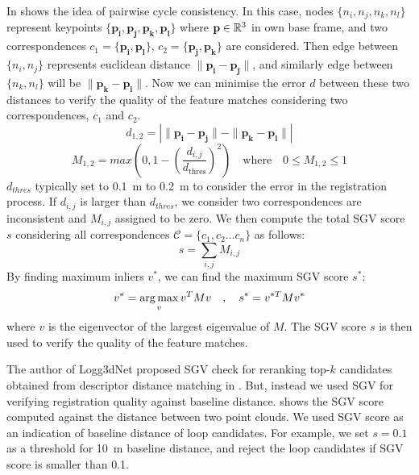 In  shows the idea of pairwise cycle consistency. In this case, nodes $\{n_i, n_j, n_k, n_l\}$ represent keypoints $\{\mathbf{p_i}, \mathbf{p_j}, \mathbf{p_k}, \mathbf{p_l}\}$ where $\mathbf{p} \in \mathbb{R}^{3}$ in own base frame, and two correspondences $c_1 =\{\mathbf{p_i}, \mathbf{p_l}\}$, $c_2=\{\mathbf{p_j}, \mathbf{p_k}\}$ are considered. Then edge between $\{n_i, n_j\}$  represents euclidean distance $\| \mathbf{p_i}-\mathbf{p_j} \|$, and similarly edge between $\{n_k, n_l\}$ will be $\| \mathbf{p_k}-\mathbf{p_l} \|$. Now we can minimise the error $d$ between these two distances to verify the quality of the feature matches considering two correspondences, $c_1$ and $c_2$. 
\begin{equation}
  d_{1,2} = |\| \mathbf{p_i}-\mathbf{p_j} \| - \| \mathbf{p_k}-\mathbf{p_l} \| | 
\end{equation}
\begin{equation}
  M_{1,2} = max( 0 , 1 - \left(\frac{d_{i,j}}{d_{\text{thres}}}\right)^2 ) 
  \quad \text{where} \quad 0 \leq M_{1,2} \leq 1 
\end{equation}
$d_{thres}$ typically set to \SI{0.1}{\meter} to \SI{0.2}{\meter} to consider the error in the registration process. If $d_{i,j}$ is larger than $d_{thres}$, we consider two correspondences are inconsistent and $M_{i,j}$ assigned to be zero.  
We then compute the total SGV score $s$ considering all correspondences $\mathcal{C}=\{c_1, c_2 \ldots c_n\}$ as follows:
\begin{equation}
  s = \sum_{i,j} M_{i,j} 
\end{equation}
By finding maximum inliers $v^{*}$, we can find the maximum SGV score $s^{*}$: 
\begin{equation}
  v^{*} = \operatorname*{arg\,max}_{v} v^T M v \quad, \quad
  s^{*} = v^{*T} M v^{*}
\end{equation}
where $v$ is the eigenvector of the largest eigenvalue of $M$. The SGV score $s$ is then used to verify the quality of the feature matches.

The author of Logg3dNet proposed SGV check for reranking top-$k$ candidates obtained from descriptor distance matching in . But, instead we used SGV for verifying registration quality against baseline distance.  shows the SGV score computed against the distance between two point clouds. We used SGV score as an indication of baseline distance of loop candidates. For example, we set $s=0.1$ as a threshold for \SI{10}{\meter} baseline distance, and reject the loop candidates if SGV score is smaller than 0.1.



